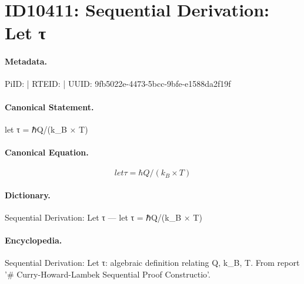 \section*{ID10411: Sequential Derivation: Let τ}
\paragraph{Metadata.}
PiID:  | RTEID:  | UUID: 9fb5022e-4473-5bcc-9bfe-e1588da2f19f

\paragraph{Canonical Statement.}
let τ = ℏQ/(k\_B × T)

\paragraph{Canonical Equation.}
\[
let τ = ℏQ/(k_B × T)
\]

\paragraph{Dictionary.}
Sequential Derivation: Let τ — let τ = ℏQ/(k\_B × T)

\paragraph{Encyclopedia.}
Sequential Derivation: Let τ: algebraic definition relating Q, k\_B, T. From report '\# Curry-Howard-Lambek Sequential Proof Constructio'.
